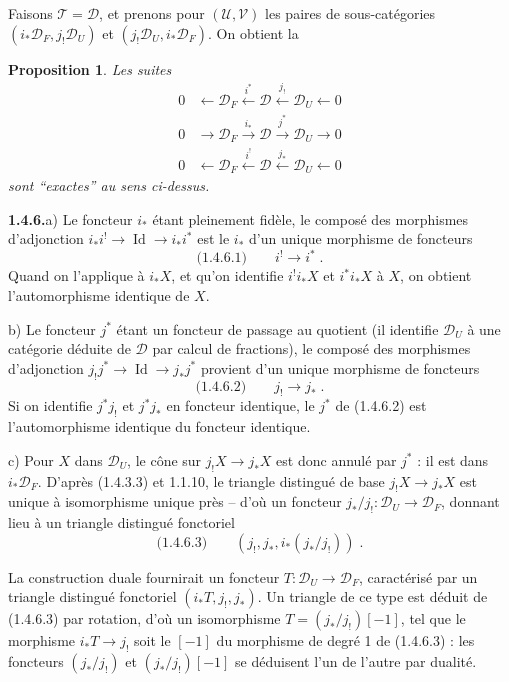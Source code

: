 \documentclass[12pt,a4paper]{article}
\theoremstyle{plain}
\newtheorem{proposition}[theorem]{Proposition}
\theoremstyle{definition}
\DeclareMathOperator{\Id}{Id}
\begin{document}
Faisons $\mathcal{T} = \mathcal{D}$, et prenons pour $(\mathcal{U},\mathcal{V})$ les paires de sous-cat\'egories $(i_*\mathcal{D}_F, j_!\mathcal{D}_U)$ et $(j_!\mathcal{D}_U, i_*\mathcal{D}_F)$. On obtient la

\begin{proposition}\label{prop:1.4.5}
Les suites
\begin{align*}
0 &\longleftarrow \mathcal{D}_F \xleftarrow{\,i^*\,} \mathcal{D} \xleftarrow{\,j_!\,} \mathcal{D}_U \longleftarrow 0 \\
0 &\longrightarrow \mathcal{D}_F \xrightarrow{\,i_*\,} \mathcal{D} \xrightarrow{\,j^*\,} \mathcal{D}_U \longrightarrow 0 \\
0 &\longleftarrow \mathcal{D}_F \xleftarrow{\,i^!\,} \mathcal{D} \xleftarrow{\,j_*\,} \mathcal{D}_U \longleftarrow 0
\end{align*}
sont ``exactes'' au sens ci-dessus.
\end{proposition}

\smallskip
\noindent\textbf{1.4.6.}\quad a) Le foncteur $i_*$ \'etant pleinement fid\`ele, le compos\'e des morphismes d'adjonction $i_*i^! \to \Id \to i_*i^*$ est le $i_*$ d'un unique morphisme de foncteurs
\[
\text{(1.4.6.1)}\qquad i^! \longrightarrow i^*\;.
\]
Quand on l'applique \`a $i_*X$, et qu'on identifie $i^!i_*X$ et $i^*i_*X$ \`a $X$, on obtient l'automorphisme identique de $X$.

b) Le foncteur $j^*$ \'etant un foncteur de passage au quotient (il identifie $\mathcal{D}_U$ \`a une cat\'egorie d\'eduite de $\mathcal{D}$ par calcul de fractions), le compos\'e des morphismes d'adjonction $j_!j^* \to \Id \to j_*j^*$ provient d'un unique morphisme de foncteurs
\[
\text{(1.4.6.2)}\qquad j_! \longrightarrow j_*\;.
\]
Si on identifie $j^*j_!$ et $j^*j_*$ en foncteur identique, le $j^*$ de (1.4.6.2) est l'automorphisme identique du foncteur identique.

c) Pour $X$ dans $\mathcal{D}_U$, le c\^one sur $j_!X \to j_*X$ est donc annul\'e par $j^*$ : il est dans $i_*\mathcal{D}_F$. D'apr\`es (1.4.3.3) et 1.1.10, le triangle distingu\'e de base $j_!X \to j_*X$ est unique \`a isomorphisme unique pr\`es -- d'o\`u un foncteur $j_*/j_! : \mathcal{D}_U \to \mathcal{D}_F$, donnant lieu \`a un triangle distingu\'e fonctoriel
\[
\text{(1.4.6.3)}\qquad (j_!, j_*, i_*(j_*/j_!))\;.
\]

La construction duale fournirait un foncteur $T : \mathcal{D}_U \to \mathcal{D}_F$, caract\'eris\'e par un triangle distingu\'e fonctoriel $(i_*T, j_!, j_*)$. Un triangle de ce type est d\'eduit de (1.4.6.3) par rotation, d'o\`u un isomorphisme $T = (j_*/j_!)[-1]$, tel que le morphisme $i_*T \to j_!$ soit le $[-1]$ du morphisme de degr\'e 1 de (1.4.6.3) : les foncteurs $(j_*/j_!)$ et $(j_*/j_!)[-1]$ se d\'eduisent l'un de l'autre par dualit\'e.
\end{document}
